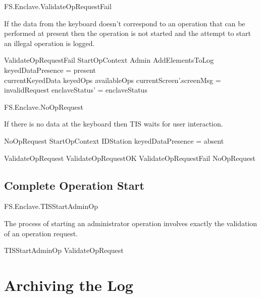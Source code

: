 \begin{traceunit}{FS.Enclave.ValidateOpRequestFail}
\end{traceunit}

If the data from the keyboard doesn't correspond to an operation that
can be performed at present then the operation is not started and the
attempt to start an illegal operation is logged.

\begin{schema}{ValidateOpRequestFail}
        StartOpContext
\also
        \Xi Admin
\also
        AddElementsToLog
\where
        keyedDataPresence = present
\\      currentKeyedData  \notin keyedOps \limg availableOps \rimg
\also
        currentScreen'.screenMsg = invalidRequest
\also
        enclaveStatus' = enclaveStatus
\end{schema}


\begin{traceunit}{FS.Enclave.NoOpRequest}
\end{traceunit}


If there is no data at the keyboard then TIS waits for user interaction.

\begin{schema}{NoOpRequest}
        StartOpContext
\also
        \Xi IDStation
\where
        keyedDataPresence = absent
\end{schema}

\begin{zed}
        ValidateOpRequest  ValidateOpRequestOK \lor
        ValidateOpRequestFail \lor NoOpRequest
\end{zed}

\subsection{Complete Operation Start}


\begin{traceunit}{FS.Enclave.TISStartAdminOp}
\end{traceunit}

The process of starting an administrator operation involves exactly the validation of an
operation request.

\begin{zed}
        TISStartAdminOp  ValidateOpRequest
\end{zed}


\section{Archiving the Log}


